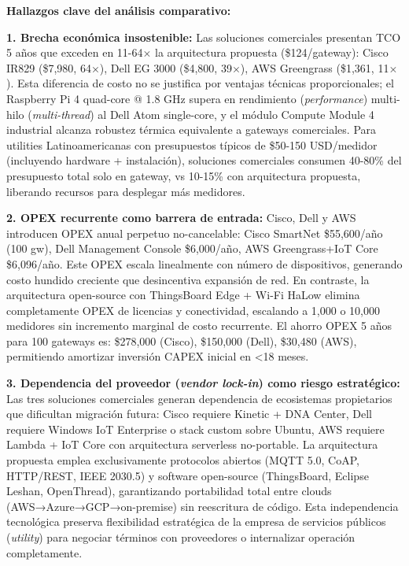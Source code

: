 \textbf{Hallazgos clave del análisis comparativo:}

\textbf{1. Brecha económica insostenible:} Las soluciones comerciales presentan TCO 5 años que exceden en 11-64$\times$ la arquitectura propuesta (\$124/gateway): Cisco IR829 (\$7,980, 64$\times$), Dell EG 3000 (\$4,800, 39$\times$), AWS Greengrass (\$1,361, 11$\times$). Esta diferencia de costo no se justifica por ventajas técnicas proporcionales; el Raspberry Pi 4 quad-core @ 1.8 GHz supera en rendimiento (\textit{performance}) multi-hilo (\textit{multi-thread}) al Dell Atom single-core, y el módulo Compute Module 4 industrial alcanza robustez térmica equivalente a gateways comerciales. Para utilities Latinoamericanas con presupuestos típicos de \$50-150 USD/medidor (incluyendo hardware + instalación), soluciones comerciales consumen 40-80\% del presupuesto total solo en gateway, vs 10-15\% con arquitectura propuesta, liberando recursos para desplegar más medidores.

\textbf{2. OPEX recurrente como barrera de entrada:} Cisco, Dell y AWS introducen OPEX anual perpetuo no-cancelable: Cisco SmartNet \$55,600/año (100 gw), Dell Management Console \$6,000/año, AWS Greengrass+IoT Core \$6,096/año. Este OPEX escala linealmente con número de dispositivos, generando costo hundido creciente que desincentiva expansión de red. En contraste, la arquitectura open-source con ThingsBoard Edge + Wi-Fi HaLow elimina completamente OPEX de licencias y conectividad, escalando a 1,000 o 10,000 medidores sin incremento marginal de costo recurrente. El ahorro OPEX 5 años para 100 gateways es: \$278,000 (Cisco), \$150,000 (Dell), \$30,480 (AWS), permitiendo amortizar inversión CAPEX inicial en <18 meses.

\textbf{3. Dependencia del proveedor (\textit{vendor lock-in}) como riesgo estratégico:} Las tres soluciones comerciales generan dependencia de ecosistemas propietarios que dificultan migración futura: Cisco requiere Kinetic + DNA Center, Dell requiere Windows IoT Enterprise o stack custom sobre Ubuntu, AWS requiere Lambda + IoT Core con arquitectura serverless no-portable. La arquitectura propuesta emplea exclusivamente protocolos abiertos (MQTT 5.0, CoAP, HTTP/REST, IEEE 2030.5) y software open-source (ThingsBoard, Eclipse Leshan, OpenThread), garantizando portabilidad total entre clouds (AWS→Azure→GCP→on-premise) sin reescritura de código. Esta independencia tecnológica preserva flexibilidad estratégica de la empresa de servicios públicos (\textit{utility}) para negociar términos con proveedores o internalizar operación completamente.


